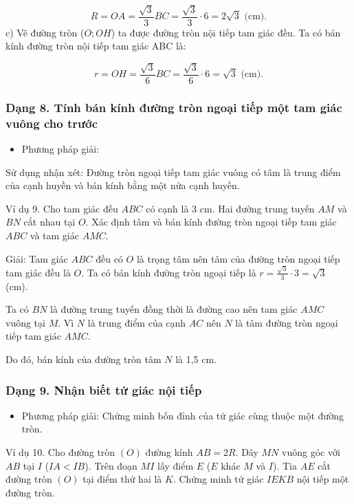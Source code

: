 \documentclass[%
    fontsize=12pt,%
    chapterprefix=false,%
    open=right,%
    twoside=false,%
    numbers=noenddot,%
    headings=optiontohead,%
    final,%
    DIV=15,%
    parskip=half %
]{scrbook}
\begin{document}
\[ R = OA = \frac{\sqrt{3}}{3}BC = \frac{\sqrt{3}}{3} \cdot 6 = 2\sqrt{3} \text{ (cm)}. \]
c) Vẽ đường tròn ($ O; OH $) ta được đường tròn nội tiếp tam giác đều. Ta có bán kính đường tròn nội tiếp tam giác ABC là:

\[ r = OH = \frac{\sqrt{3}}{6}BC = \frac{\sqrt{3}}{6} \cdot 6 = \sqrt{3} \text{ (cm)}. \]

\subsubsection{Dạng 8. Tính bán kính đường tròn ngoại tiếp một tam giác vuông cho trước}

\begin{itemize}
  \item Phương pháp giải:
\end{itemize}

Sử dụng nhận xét: Đường tròn ngoại tiếp tam giác vuông có tâm là trung điểm của cạnh huyền và bán kính bằng một nửa cạnh huyền.

Ví dụ 9. Cho tam giác đều $ABC$ có cạnh là 3 cm. Hai đường trung tuyến $AM$ và $BN$ cắt nhau tại $O$. Xác định tâm và bán kính đường tròn ngoại tiếp tam giác $ABC$ và tam giác $AMC$.

Giải: Tam giác $ABC$ đều có $O$ là trọng tâm nên tâm của đường tròn ngoại tiếp tam giác đều là $O$. Ta có bán kính đường tròn ngoại tiếp là $r = \frac{\sqrt{3}}{3} \cdot 3 = \sqrt{3}$ (cm).

Ta có $BN$ là đường trung tuyến đồng thời là đường cao nên tam giác $AMC$ vuông tại $M$. Vì $N$ là trung điểm của cạnh $AC$ nên $N$ là tâm đường tròn ngoại tiếp tam giác $AMC$.

Do đó, bán kính của đường tròn tâm $N$ là 1,5 cm.
\subsubsection{Dạng 9. Nhận biết tứ giác nội tiếp}

\begin{itemize}
  \item Phương pháp giải: Chứng minh bốn đỉnh của tứ giác cùng thuộc một đường tròn.
\end{itemize}

Ví dụ 10. Cho đường tròn $(O)$ đường kính $AB = 2R$. Dây $MN$ vuông góc với $AB$ tại $I$ ($IA < IB$). Trên đoạn $MI$ lấy điểm $E$ ($E$ khác $M$ và $I$). Tia $AE$ cắt đường tròn $(O)$ tại điểm thứ hai là $K$. Chứng minh tứ giác $IEKB$ nội tiếp một đường tròn.
\end{document}
